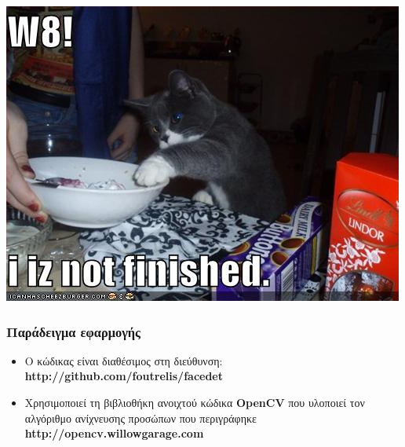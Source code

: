 \documentclass{beamer}
\begin{document}
\begin{frame}
\includegraphics[width=\textwidth]{images/not-finished}
\end{frame}

\begin{frame}
\frametitle{Παράδειγμα εφαρμογής}
\begin{itemize}
\item Ο κώδικας είναι διαθέσιμος στη διεύθυνση:
\textbf{http://github.com/foutrelis/facedet}
\item Χρησιμοποιεί τη βιβλιοθήκη ανοιχτού κώδικα \textbf{OpenCV} που υλοποιεί
	τον αλγόριθμο ανίχνευσης προσώπων που περιγράφηκε\\
	\textbf{http://opencv.willowgarage.com}
\end{itemize}
\end{frame}
\end{document}
